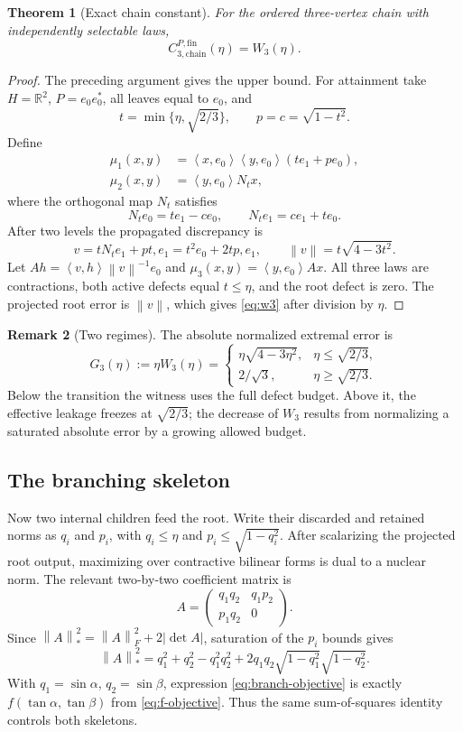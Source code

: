 \documentclass[11pt]{article}
\newtheorem{theorem}{Theorem}[section]
\theoremstyle{definition}
\newtheorem{remark}[theorem]{Remark}
\newcommand{\R}{\mathbb{R}}
\newcommand{\fin}{\mathrm{fin}}
\newcommand{\norm}[1]{\left\lVert #1\right\rVert}
\newcommand{\ip}[2]{\left\langle #1,#2\right\rangle}
\begin{document}
\begin{theorem}[Exact chain constant]\label{thm:chain}
For the ordered three-vertex chain with independently selectable laws,
\[
 C_{3,\mathrm{chain}}^{P,\fin}(\eta)=W_3(\eta).
\]
\end{theorem}
\begin{proof}
The preceding argument gives the upper bound.  For attainment take
$H=\R^2$, $P=e_0e_0^*$, all leaves equal to $e_0$, and
\[
 t=\min\{\eta,\sqrt{2/3}\},\qquad p=c=\sqrt{1-t^2}.
\]
Define
\begin{align*}
 \mu_1(x,y)&=\ip{x}{e_0}\ip{y}{e_0}(te_1+pe_0),\\
 \mu_2(x,y)&=\ip{y}{e_0}N_tx,
\end{align*}
where the orthogonal map $N_t$ satisfies
\[
 N_te_0=te_1-ce_0,\qquad N_te_1=ce_1+te_0.
\]
After two levels the propagated discrepancy is
\[
 v=tN_te_1+pt,e_1=t^2e_0+2tp,e_1,
 \qquad \norm v=t\sqrt{4-3t^2}.
\]
Let $Ah=\ip{v}{h}\norm v^{-1}e_0$ and
$\mu_3(x,y)=\ip{y}{e_0}Ax$.  All three laws are contractions, both active
defects equal $t\le\eta$, and the root defect is zero.  The projected root
error is $\norm v$, which gives \eqref{eq:w3} after division by $\eta$.
\end{proof}

\begin{remark}[Two regimes]
The absolute normalized extremal error is
\[
 G_3(\eta):=\eta W_3(\eta)=
 \begin{cases}
 \eta\sqrt{4-3\eta^2},&\eta\le\sqrt{2/3},\\[1mm]
 2/\sqrt3,&\eta\ge\sqrt{2/3}.
 \end{cases}
\]
Below the transition the witness uses the full defect budget.  Above it, the
effective leakage freezes at $\sqrt{2/3}$; the decrease of $W_3$ results from
normalizing a saturated absolute error by a growing allowed budget.
\end{remark}

\subsection{The branching skeleton}

Now two internal children feed the root.  Write their discarded and retained
norms as $q_i$ and $p_i$, with
$q_i\le\eta$ and $p_i\le\sqrt{1-q_i^2}$.  After scalarizing the projected root
output, maximizing over contractive bilinear forms is dual to a nuclear norm.
The relevant two-by-two coefficient matrix is
\[
 A=\begin{pmatrix}
 q_1q_2&q_1p_2\\
 p_1q_2&0
 \end{pmatrix}.
\]
Since $\norm A_*^2=\norm A_F^2+2|\det A|$, saturation of the $p_i$ bounds gives
\begin{equation}\label{eq:branch-objective}
 \norm A_*^2=
 q_1^2+q_2^2-q_1^2q_2^2
 +2q_1q_2\sqrt{1-q_1^2}\sqrt{1-q_2^2}.
\end{equation}
With $q_1=\sin\alpha$, $q_2=\sin\beta$, expression
\eqref{eq:branch-objective} is exactly $f(\tan\alpha,\tan\beta)$ from
\eqref{eq:f-objective}.  Thus the same sum-of-squares identity controls both
skeletons.
\end{document}
